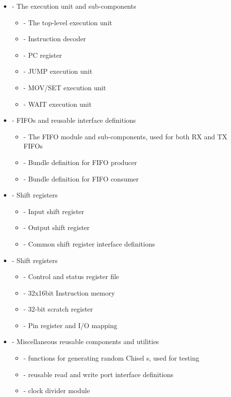\begin{itemize}
    \item {} - The execution unit and sub-components
          \begin{itemize}
              \item {} - The top-level execution unit
              \item {} - Instruction decoder
              \item {} - PC register
              \item {} - JUMP execution unit
              \item {} - MOV/SET execution unit
              \item {} - WAIT execution unit
          \end{itemize}
    \item {} - FIFOs and reusable interface definitions
          \begin{itemize}
              \item {} - The FIFO module and sub-components, used for both RX and TX FIFOs
              \item {} - Bundle definition for FIFO producer
              \item {} - Bundle definition for FIFO consumer
          \end{itemize}
    \item {} - Shift registers
          \begin{itemize}
              \item {} - Input shift register
              \item {} - Output shift register
              \item {} - Common shift register interface definitions
          \end{itemize}
    \item {} - Shift registers
          \begin{itemize}
              \item {} - Control and status register file
              \item {} - 32x16bit Instruction memory
              \item {} - 32-bit scratch register
              \item {} - Pin register and I/O mapping
          \end{itemize}
    \item {} - Miscellaneous reusable components and utilities
          \begin{itemize}
              \item {} - functions for generating random Chisel s, used for testing
              \item {} - reusable read and write port interface definitions
              \item {} - clock divider module
          \end{itemize}
\end{itemize}

